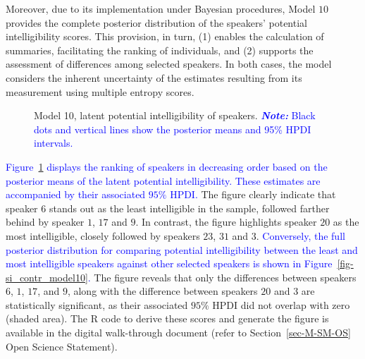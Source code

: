 \documentclass[
  authoryear,
  preprint,
  1p]{elsarticle}
\begin{document}
Moreover, due to its implementation under Bayesian procedures, Model
\(10\) provides the complete posterior distribution of the speakers'
potential intelligibility scores. This provision, in turn, (1) enables
the calculation of summaries, facilitating the ranking of individuals,
and (2) supports the assessment of differences among selected speakers.
In both cases, the model considers the inherent uncertainty of the
estimates resulting from its measurement using multiple entropy scores.

\label{cell-fig-rq2-si-model10}
\begin{figure}[H]


\caption{\label{fig-rq2-si-model10}Model 10, latent potential
intelligibility of speakers. \textcolor{blue}{\textbf{\emph{Note:}} Black dots and
vertical lines show the posterior means and 95\% HPDI intervals.}}

\end{figure}%

\textcolor{blue}{Figure~\ref{fig-rq2-si-model10} displays the ranking of speakers in
decreasing order based on the posterior means of the latent potential
intelligibility. These estimates are accompanied by their associated
\(95\%\) HPDI.} The figure clearly indicate that speaker \(6\) stands
out as the least intelligible in the sample, followed farther behind by
speaker \(1\), \(17\) and \(9\). In contrast, the figure highlights
speaker \(20\) as the most intelligible, closely followed by speakers
\(23\), \(31\) and \(3\). \textcolor{blue}{Conversely, the full posterior distribution
for comparing potential intelligibility between the least and most
intelligible speakers against other selected speakers is shown in
Figure~\ref{fig-si_contr_model10}.} The figure reveals that only the
differences between speakers \(6\), \(1\), \(17\), and \(9\), along with
the difference between speakers \(20\) and \(3\) are statistically
significant, as their associated \(95\%\) HPDI did not overlap with zero
(shaded area). The R code to derive these scores and generate the figure
is available in the digital walk-through document (refer to
Section~\ref{sec-M-SM-OS} Open Science Statement).
\end{document}
